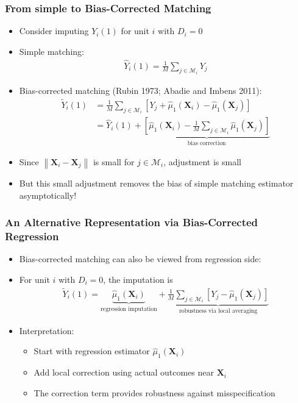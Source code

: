 \documentclass[10pt, handout]{beamer}
\newcommand{\norm}[1]{\left\lVert#1\right\rVert}
\begin{document}
\begin{frame}
  \frametitle{From simple to Bias-Corrected Matching}

  \begin{itemize}
    \item Consider imputing $Y_i(1)$ for unit $i$ with $D_i = 0$
    \item Simple matching:
    \begin{align*}
      \hat{Y}_i(1) = \frac{1}{M} \sum_{j \in \mathcal{M}_i} Y_j
    \end{align*}
    \item Bias-corrected matching (Rubin 1973; Abadie and Imbens 2011):
    \begin{align*}
      \tilde{Y}_i(1) &= \frac{1}{M} \sum_{j \in \mathcal{M}_i} \left[ Y_j + \hat{\mu}_1(\mathbf{X}_i) - \hat{\mu}_1(\mathbf{X}_j) \right]\\
      &= \hat{Y}_i(1) + \underbrace{\left[ \hat{\mu}_1 (\mathbf{X}_i) - \frac{1}{M} \sum_{j \in \mathcal{M}_i} \hat{\mu}_1(\mathbf{X}_j) \right]}_{\text{bias correction}}
    \end{align*}
    \item Since $\norm{\mathbf{X}_i - \mathbf{X}_j}$ is small for $j \in \mathcal{M}_i$, adjustment is small
    \item But this small adjustment removes the bias of simple matching estimator asymptotically!
  \end{itemize}
  
\end{frame}


\begin{frame}
  \frametitle{An Alternative Representation via Bias-Corrected Regression}

  \begin{itemize}
    \item Bias-corrected matching can also be viewed from regression side:
    \item For unit $i$ with $D_i = 0$, the imputation is 
    \begin{align*}
      \tilde{Y}_i(1) = \underbrace{\hat{\mu}_1(\mathbf{X}_i)}_{\text{regression imputation}} + \underbrace{\frac{1}{M} \sum_{j \in \mathcal{M}_i} \left[ Y_j - \hat{\mu}_1(\mathbf{X}_j) \right]}_{\text{robustness via local averaging}}
    \end{align*}
    \item Interpretation:
    \begin{itemize}
      \item Start with regression estimator $\hat{\mu}_1(\mathbf{X}_i)$
      \item Add local correction using actual outcomes near $\mathbf{X}_i$
      \item The correction term provides robustness against misspecification
    \end{itemize}
  \end{itemize}
\end{frame}
\end{document}
